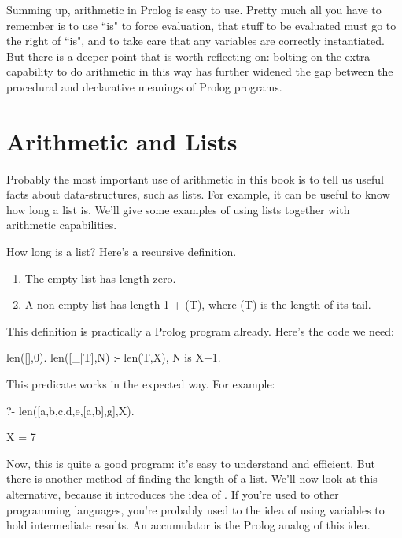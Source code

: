 Summing up, arithmetic in Prolog is easy to use.  Pretty much all you
have to remember is to use ``is" to force evaluation, that stuff to be
evaluated must go to the right of ``is", and to take care that any
variables are correctly instantiated.  But there is a deeper point
that is worth reflecting on: bolting on the extra capability to do
arithmetic in this way has further widened the gap between the
procedural and declarative meanings of Prolog programs.





\section{Arithmetic and Lists}\label{SEC.L5.ARITHMETIC-AND-LISTS}

Probably the most important use of arithmetic in this book is to tell
us useful facts about data-structures, such as lists.  For example, it
can be useful to know how long a list is.  We'll give some examples of
using lists together with arithmetic capabilities.

How long is a list? Here's a recursive definition.
\begin{enumerate}
\item{}The empty list has length zero.
\item{}A non-empty list has length
         1 + (T), where (T) is the length of its
        tail.
\end{enumerate}


This definition is practically a Prolog program already.  Here's the
code we need:
\begin{LPNcodedisplay}
len([],0).
len([_|T],N) :- len(T,X), N is X+1.
\end{LPNcodedisplay}

This predicate works in the expected way.
For example:
\begin{LPNcodedisplay}
?- len([a,b,c,d,e,[a,b],g],X).

X = 7
\end{LPNcodedisplay}

\clearpage
Now, this is quite a good program: it's easy to understand and
efficient.  But there is another method of finding the length of a
list.  We'll now look at this alternative, because it introduces the
idea of . If you're used to other programming
languages, you're probably used to the idea of using variables to hold
intermediate results.  An accumulator is the Prolog analog of this
idea.


